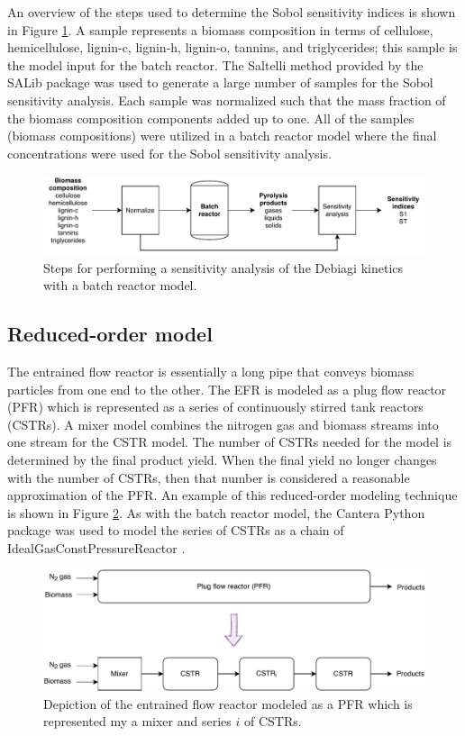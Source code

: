 An overview of the steps used to determine the Sobol sensitivity indices is shown in Figure \ref{fig:sa-diagram}. A sample represents a biomass composition in terms of cellulose, hemicellulose, lignin-c, lignin-h, lignin-o, tannins, and triglycerides; this sample is the model input for the batch reactor. The Saltelli method provided by the SALib package was used to generate a large number of samples for the Sobol sensitivity analysis. Each sample was normalized such that the mass fraction of the biomass composition components added up to one. All of the samples (biomass compositions) were utilized in a batch reactor model where the final concentrations were used for the Sobol sensitivity analysis.

\begin{figure}[H]
    \centering
    \includegraphics[width=\textwidth]{figures/sa-diagram.pdf}
    \caption{Steps for performing a sensitivity analysis of the Debiagi kinetics with a batch reactor model.}
    \label{fig:sa-diagram}
\end{figure}

\subsection{Reduced-order model}

The entrained flow reactor is essentially a long pipe that conveys biomass particles from one end to the other. The EFR is modeled as a plug flow reactor (PFR) which is represented as a series of continuously stirred tank reactors (CSTRs). A mixer model combines the nitrogen gas and biomass streams into one stream for the CSTR model. The number of CSTRs needed for the model is determined by the final product yield. When the final yield no longer changes with the number of CSTRs, then that number is considered a reasonable approximation of the PFR. An example of this reduced-order modeling technique is shown in Figure \ref{fig:pfr-diagram}. As with the batch reactor model, the Cantera Python package was used to model the series of CSTRs as a chain of IdealGasConstPressureReactor \cite{Cantera-2018}.

\begin{figure}[H]
    \centering
    \includegraphics[width=\textwidth]{figures/pfr-diagram.pdf}
    \caption{Depiction of the entrained flow reactor modeled as a PFR which is represented my a mixer and series $i$ of CSTRs.}
    \label{fig:pfr-diagram}
\end{figure}
